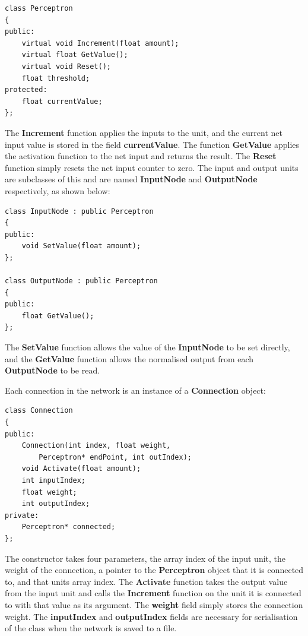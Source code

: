 \documentclass{acm_proc_article-sp}
\begin{document}
\begin{verbatim}
class Perceptron
{
public:
    virtual void Increment(float amount);
    virtual float GetValue();
    virtual void Reset();
    float threshold;
protected:
    float currentValue;	
};
\end{verbatim}

The \textbf{Increment} function applies the inputs to the unit, and the current net input value is stored in the field \textbf{currentValue}. The function \textbf{GetValue} applies the activation function to the net input and returns the result. The \textbf{Reset} function simply resets the net input counter to zero. The input and output units are subclasses of this and are named \textbf{InputNode} and \textbf{OutputNode} respectively, as shown below:

\begin{verbatim}
class InputNode : public Perceptron
{
public:
    void SetValue(float amount);
};

class OutputNode : public Perceptron
{
public:
    float GetValue();
};
\end{verbatim}

The \textbf{SetValue} function allows the value of the \textbf{InputNode} to be set directly, and the \textbf{GetValue} function allows the normalised output from each \textbf{OutputNode} to be read.

\vspace{3mm}

Each connection in the network is an instance of a \textbf{Connection} object:

\begin{verbatim}
class Connection
{
public:
    Connection(int index, float weight, 
        Perceptron* endPoint, int outIndex);
    void Activate(float amount);
    int inputIndex;
    float weight;
    int outputIndex;
private:
    Perceptron* connected;
};
\end{verbatim}

The constructor takes four parameters, the array index of the input unit, the weight of the connection, a pointer to the \textbf{Perceptron} object that it is connected to, and that units array index. The \textbf{Activate} function takes the output value from the input unit and calls the \textbf{Increment} function on the unit it is connected to with that value as its argument. The \textbf{weight} field simply stores the connection weight. The \textbf{inputIndex} and \textbf{outputIndex} fields are necessary for serialisation of the class when the network is saved to a file.
\end{document}
